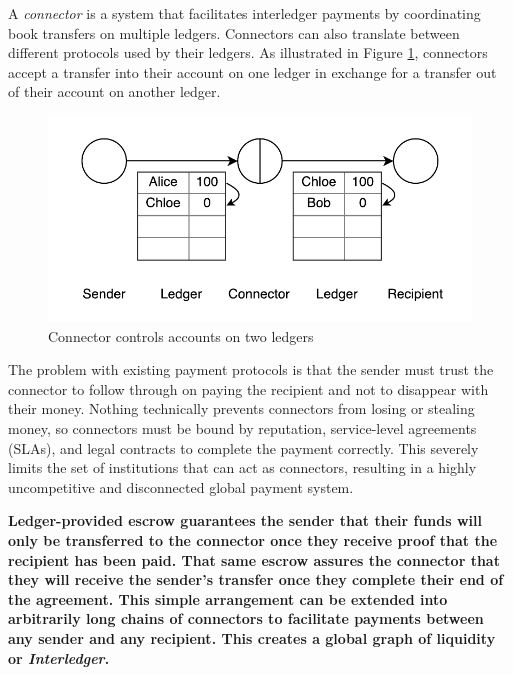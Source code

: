 \documentclass[letterpaper,twocolumn,10pt]{article}
\begin{document}

A \textit{connector} is a system that facilitates interledger payments by coordinating book transfers on multiple ledgers. Connectors can also translate between different protocols used by their ledgers. As illustrated in Figure \ref{fig:connector}, connectors accept a transfer into their account on one ledger in exchange for a transfer out of their account on another ledger. 

\begin{figure}[ht]
    \centering
    \includegraphics[width=\columnwidth]{figures/connector.pdf}
    \caption{Connector controls accounts on two ledgers}
    \label{fig:connector}
\end{figure}


\newpage

The problem with existing payment protocols is that the sender must trust the connector to follow through on paying the recipient and not to disappear with their money. Nothing technically prevents connectors from losing or stealing money, so connectors must be bound by reputation, service-level agreements (SLAs), and legal contracts to complete the payment correctly. This severely limits the set of institutions that can act as connectors, resulting in a highly uncompetitive and disconnected global payment system.

\textbf{Ledger-provided escrow guarantees the sender that their funds will only be transferred to the connector once they receive proof that the recipient has been paid. That same escrow assures the connector that they will receive the sender's transfer once they complete their end of the agreement. This simple arrangement can be extended into arbitrarily long chains of connectors to facilitate payments between any sender and any recipient. This creates a global graph of liquidity or \textit{Interledger}.}
\end{document}
